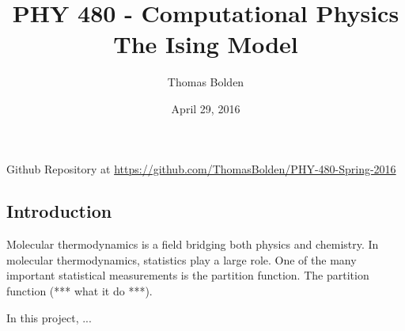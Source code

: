 \documentclass[11pt]{article}
\title{PHY 480 - Computational Physics \\ The Ising Model}
\author{Thomas Bolden}
\date{April 29, 2016}
\begin{document}
\maketitle

\thispagestyle{empty}

\centerline{Github Repository at \href{https://github.com/ThomasBolden/PHY-480-Spring-2016}{https://github.com/ThomasBolden/PHY-480-Spring-2016}}

\begin{abstract}

    \lipsum[1-1]

\end{abstract}

\vfill

\tableofcontents

\vspace{3cm}

\pagebreak

\subsection{Introduction}

    Molecular thermodynamics is a field bridging both physics and chemistry. In molecular thermodynamics, statistics play a large role. One of the many important statistical measurements is the partition function. The partition function (*** what it do ***). 


    In this project, ...
\end{document}
